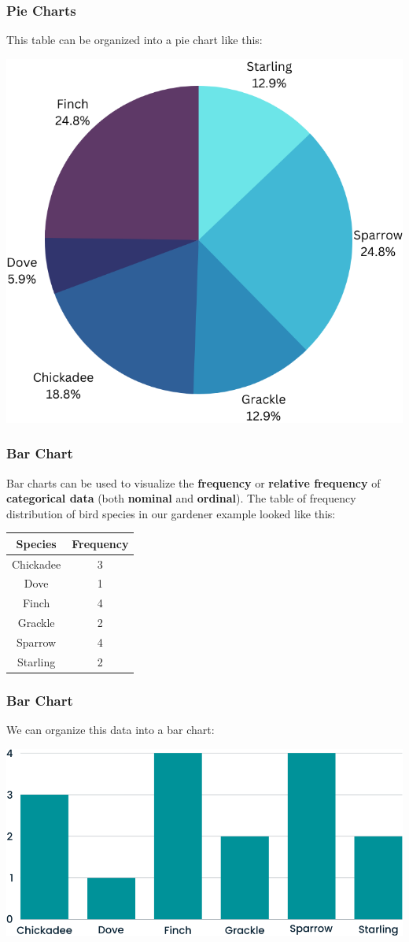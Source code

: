 \documentclass[aspectratio=169,11pt,svgnames]{beamer}
\begin{document}
\begin{frame}
 \frametitle{Pie Charts}
 This table can be organized into a pie chart like this:
 \begin{center}
  \includegraphics[width=.4\textwidth]{gardener_pie.png}
 \end{center}
\end{frame}

\begin{frame}
 \frametitle{Bar Chart}
 Bar charts can be used to visualize the \textbf{frequency} or \textbf{relative
 frequency} of \textbf{categorical data} (both \textbf{nominal} and
 \textbf{ordinal}). \pause
 The table of frequency distribution of bird species in our gardener example
 looked like this:
 \begin{center}
  \begin{tabular}{c|c}
   \textbf{Species} & \textbf{Frequency}\\
   \toprule
   Chickadee & 3\\
   Dove & 1\\
   Finch & 4\\
   Grackle & 2\\
   Sparrow & 4\\
   Starling & 2
  \end{tabular}
 \end{center}
\end{frame}

\begin{frame}
 \frametitle{Bar Chart}
 We can organize this data into a bar chart:
 \begin{center}
  \includegraphics[width=.7\textwidth]{gardener_bar}
 \end{center}
\end{frame}
\end{document}

